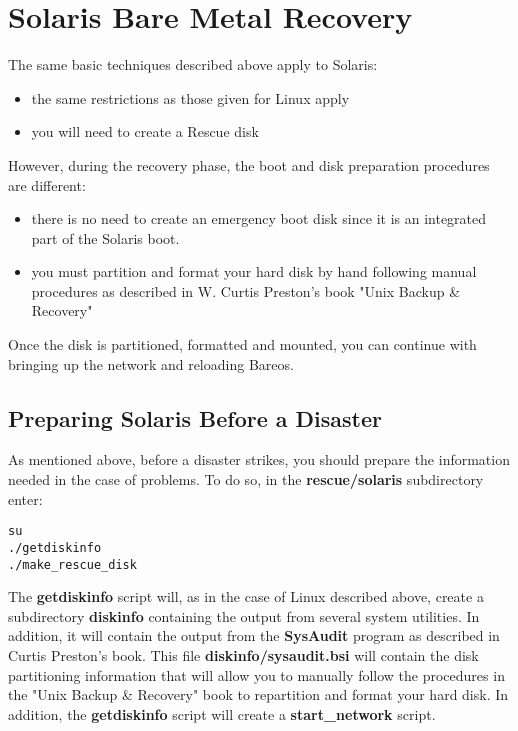 \section{Solaris Bare Metal Recovery}
\label{solaris}

The same basic techniques described above apply to Solaris:

\begin{itemize}
\item the same restrictions as those given for Linux apply
\item you will need to create a Rescue disk
   \end{itemize}

However, during the recovery phase, the boot and disk preparation procedures
are different:

\begin{itemize}
\item there is no need to create an emergency boot disk  since it is an
   integrated part of the Solaris boot.
\item you must partition and format your hard disk by hand  following manual
   procedures as described in W. Curtis Preston's  book "Unix Backup \&
   Recovery"
\end{itemize}

Once the disk is partitioned, formatted and mounted, you can continue with
bringing up the network and reloading Bareos.

\subsection{Preparing Solaris Before a Disaster}

As mentioned above, before a disaster strikes, you should prepare the
information needed in the case of problems. To do so, in the {\bf
rescue/solaris} subdirectory enter:

\footnotesize
\begin{verbatim}
su
./getdiskinfo
./make_rescue_disk
\end{verbatim}
\normalsize

The {\bf getdiskinfo} script will, as in the case of Linux described above,
create a subdirectory {\bf diskinfo} containing the output from several system
utilities. In addition, it will contain the output from the {\bf SysAudit}
program as described in Curtis Preston's book. This file {\bf
diskinfo/sysaudit.bsi} will contain the disk partitioning information that
will allow you to manually follow the procedures in the "Unix Backup \&
Recovery" book to repartition and format your hard disk. In addition, the
{\bf getdiskinfo} script will create a {\bf start\_network} script.

